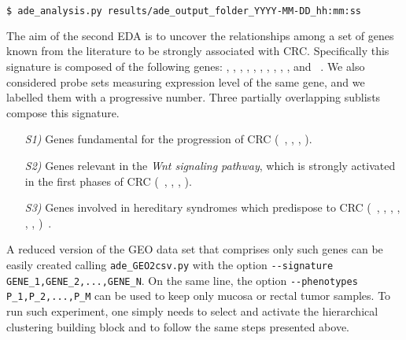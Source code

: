 {\small
\begin{lstlisting}[language=bash,caption={ },basicstyle=\ttfamily]
  $ ade_analysis.py results/ade_output_folder_YYYY-MM-DD_hh:mm:ss
\end{lstlisting}
}


The aim of the second EDA is to uncover the relationships among a set of genes known from the literature to be strongly associated with CRC. Specifically this signature is composed of the following genes: \apc, \kras, \ctnnb, \tp, \msh, \mlh, \pms, \pten, \smad, \stk, \gsk and \axin~\cite{schulz2005molecular}.
We also considered probe sets measuring expression level of the same gene, and we labelled them with a progressive number.
Three partially overlapping sublists compose this signature.
\begin{enumerate}
  \item[\emph{S1)}] Genes fundamental for the progression of CRC (\ie~\apc, \kras, \ctnnb, \tp).
  \item[\emph{S2)}] Genes relevant in the \textit{Wnt signaling pathway}, which is strongly activated in the first phases of CRC (\ie~\apc, \ctnnb, \gsk, \axin).
  \item[\emph{S3)}] Genes involved in hereditary syndromes which predispose to CRC (\ie~\apc, \msh, \mlh, \pms, \pten, \smad, \stk)~\cite{schulz2005molecular}.
\end{enumerate}

A reduced version of the GEO data set that comprises only such genes can be easily created calling {\tt ade\_GEO2csv.py} with the option {\tt -{}-signature GENE\_1,GENE\_2,...,GENE\_N}. On the same line, the option {\tt -{}-phenotypes P\_1,P\_2,...,P\_M} can be used to keep only mucosa or rectal tumor samples.
To run such experiment, one simply needs to select and activate the hierarchical clustering building block and to follow the same steps presented above.



